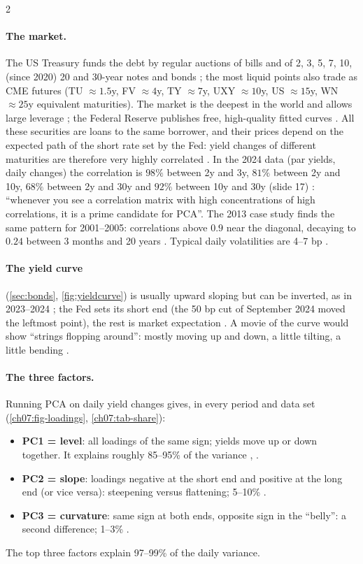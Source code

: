 \begin{paracol}{2}
\paragraph{The market.} The US Treasury funds the debt by regular auctions of bills and of 2, 3, 5, 7, 10,
(since 2020) 20 and 30-year notes and bonds ; the most liquid points also trade as CME
futures (TU $\approx1.5$y, FV $\approx4$y, TY $\approx7$y, UXY $\approx10$y, US $\approx15$y, WN $\approx25$y equivalent maturities). The
market is the deepest in the world and allows large leverage ; the Federal Reserve publishes
free, high-quality fitted curves . All these securities are loans to the same borrower, and
their prices depend on the expected path of the short rate set by the Fed: yield changes of different
maturities are therefore very highly correlated . In the 2024 data (par yields, daily changes)
the correlation is $98\%$ between 2y and 3y, $81\%$ between 2y and 10y, $68\%$ between 2y and 30y and $92\%$
between 10y and 30y (slide 17) : ``whenever you see a correlation matrix with high
concentrations of high correlations, it is a prime candidate for PCA''. The 2013 case study finds the
same pattern for 2001--2005: correlations above $0.9$ near the diagonal, decaying to $0.24$ between 3 months
and 20 years . Typical daily volatilities are 4--7 bp .

\paragraph{The yield curve} (\cref{sec:bonds}, \cref{fig:yieldcurve}) is usually upward sloping but can be
inverted, as in 2023--2024 ; the Fed sets its short end (the 50 bp cut of September 2024
moved the leftmost point), the rest is market expectation . A movie of the curve would show
``strings flopping around'': mostly moving up and down, a little tilting, a little bending .

\paragraph{The three factors.} Running PCA on daily yield changes gives, in every period and data set
(\cref{ch07:fig-loadings}, \cref{ch07:tab-share}):
\begin{itemize}
  \item \textbf{PC1 = level}: all loadings of the same sign; yields move up or down together. It explains
        roughly 85--95\% of the variance , .
  \item \textbf{PC2 = slope}: loadings negative at the short end and positive at the long end (or vice versa):
        steepening versus flattening; 5--10\% .
  \item \textbf{PC3 = curvature}: same sign at both ends, opposite sign in the ``belly'': a second difference;
        1--3\% .
\end{itemize}
The top three factors explain 97--99\% of the daily variance.


\end{paracol}

